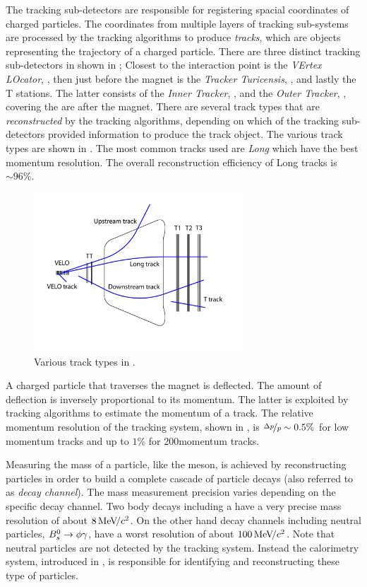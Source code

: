 The tracking sub-detectors are responsible for registering spacial coordinates of charged particles.
The coordinates from multiple layers of tracking sub-systems are processed by the tracking algorithms
to produce {\it tracks}, which are objects representing the trajectory of a charged particle. There are
three distinct tracking sub-detectors in \lhcb shown in ; Closest to the interaction point is
the {\it VErtex LOcator}, \velo, then just before the \lhcb magnet is the {\it Tracker Turicensis}, \ttracker,
and  lastly the T stations. The latter consists of the {\it Inner Tracker}, \intr, and the {\it Outer Tracker}, \ot,
covering the are after the \lhcb magnet. There are several track types that are {\it reconstructed} by
the tracking algorithms, depending on which of the tracking sub-detectors provided information to produce
the track object. The various track types are shown in . The most common tracks used
are {\it Long} which have the best momentum resolution. The overall reconstruction efficiency of Long
tracks is $\sim 96\%$.

\begin{figure}[t]
  \centering
  \includegraphics[width=0.7\textwidth]{Figures/Chapter2/trackTypesRunIAndII}
  \caption{Various track types in \lhcb.}
  \label{track_types}
\end{figure}

A charged particle that traverses the \lhcb magnet is deflected. The amount of deflection is inversely proportional
to its momentum. The latter is exploited by tracking algorithms to estimate the momentum of a track. The relative
momentum resolution of the tracking system, shown in , is $\nicefrac{\Delta p}{p} \sim 0.5 \%$
for low momentum tracks and up to $1\%$ for 200\gevc momentum tracks.

Measuring the mass of a particle, like the \Bs meson, is achieved by reconstructing particles in order to build a
complete cascade of particle decays (also referred to as {\it decay channel}). The mass measurement precision varies depending
on the specific decay channel. Two body \B decays including a \jpsi have a very precise mass resolution of about
$8 {\mathrm{\,Me\kern -0.1em V\!/}c^2}$. On the other hand decay channels including neutral particles, \ie $B^0_s\rightarrow\phi\gamma$, have a worst
resolution of about $100 {\mathrm{\,Me\kern -0.1em V\!/}c^2}$. Note that neutral particles are not detected by the tracking system.
Instead the calorimetry system, introduced in , is responsible for identifying and
reconstructing these type of particles.

